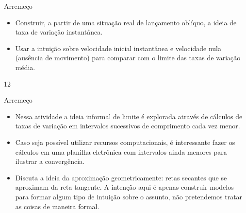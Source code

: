 \def\currentcolor{session3}
\begin{objectives}{Arremeço}
{
\begin{itemize}

\item Construir, a partir de uma situação real de lançamento oblíquo, a ideia de taxa de variação instantânea.

\item  Usar a intuição sobre velocidade inicial instantânea e velocidade nula (ausência de movimento) para comparar com o limite das taxas de variação média.

\end{itemize}
}{1}{2}
\end{objectives}
\begin{sugestions}{Arremeço}
{

\begin{itemize}

\item Nessa atividade a ideia informal de limite é explorada através de cálculos de taxas de
variação em intervalos sucessivos de comprimento cada vez menor.
\item Caso seja possível utilizar recursos computacionais, é interessante fazer os cálculos em
uma planilha eletrônica com intervalos ainda menores para ilustrar a convergência.
\item Discuta a ideia da aproximação geometricamente: retas secantes que se aproximam da
reta tangente. A intenção aqui é apenas construir modelos para formar algum tipo de
intuição sobre o assunto, não pretendemos tratar as coisas de maneira formal.

\begin{figure}[H]
\centering

\end{figure}
\end{itemize}}
\end{sugestions}
